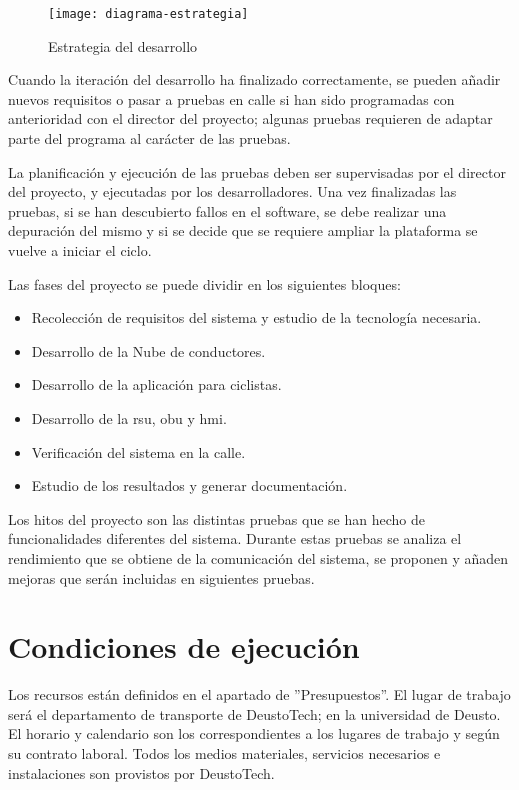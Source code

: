 \begin{figure}[t]
	\begin{center}
		\texttt{[image: diagrama-estrategia]}
		\caption{Estrategia del desarrollo}
		\label{fig:estrategia}
	\end{center}
\end{figure}

Cuando la iteración del desarrollo ha finalizado correctamente, se pueden
añadir nuevos requisitos o pasar a pruebas en calle si han sido programadas
con anterioridad con el director del proyecto; algunas pruebas requieren de
adaptar parte del programa al carácter de las pruebas.

La planificación y ejecución de las pruebas deben ser supervisadas por el
director del proyecto, y ejecutadas por los desarrolladores. Una vez
finalizadas las pruebas, si se han descubierto fallos en el software, se debe
realizar una depuración del mismo y si se decide que se requiere ampliar la
plataforma se vuelve a iniciar el ciclo.

Las fases del proyecto se puede dividir en los siguientes bloques:
\begin{itemize}
	\item Recolección de requisitos del sistema y estudio de la tecnología
	necesaria.

	\item Desarrollo de la Nube de conductores.

	\item Desarrollo de la aplicación para ciclistas.

	\item Desarrollo de la \gls{rsu}, \gls{obu} y \gls{hmi}.

	\item Verificación del sistema en la calle.

	\item Estudio de los resultados y generar documentación.
\end{itemize}

Los hitos del proyecto son las distintas pruebas que se han hecho de
funcionalidades diferentes del sistema. Durante estas pruebas se analiza el
rendimiento que se obtiene de la comunicación del sistema, se proponen y añaden
mejoras que serán incluidas en siguientes pruebas.
\section{Condiciones de ejecución}
Los recursos están definidos en el apartado de ''Presupuestos''. El lugar de
trabajo será el departamento de transporte de DeustoTech; en la universidad de
Deusto. El horario y calendario son los correspondientes a los lugares de
trabajo y según su contrato laboral. Todos los medios materiales, servicios
necesarios e instalaciones son provistos por DeustoTech.

